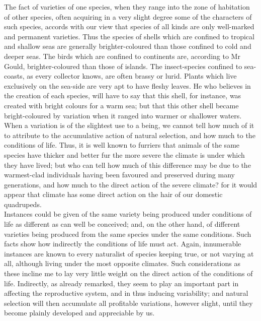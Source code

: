 \indent The fact of varieties of one species, when they range into the zone of habitation of other species, often acquiring in a very slight degree some of the characters of such species, accords with our view that species of all kinds are only well-marked and permanent varieties. Thus the species of shells which are confined to tropical and shallow seas are generally brighter-coloured than those confined to cold and deeper seas. The birds which are confined to continents are, according to Mr Gould, brighter-coloured than those of islands. The insect-species confined to sea-coasts, as every collector knows, are often brassy or lurid. Plants which live exclusively on the sea-side are very apt to have fleshy leaves. He who believes in the creation of each species, will have to say that this shell, for instance, was created with bright colours for a warm sea; but that this other shell became bright-coloured by variation when it ranged into warmer or shallower waters.\\
\indent When a variation is of the slightest use to a being, we cannot tell how much of it to attribute to the accumulative action of natural selection, and how much to the conditions of life. Thus, it is well known to furriers that animals of the same species have thicker and better fur the more severe the climate is under which they have lived; but who can tell how much of this difference may be due to the warmest-clad individuals having been favoured and preserved during many generations, and how much to the direct action of the severe climate? for it would appear that climate has some direct action on the hair of our domestic quadrupeds.\\
\indent Instances could be given of the same variety being produced under conditions of life as different as can well be conceived; and, on the other hand, of different varieties being produced from the same species under the same conditions. Such facts show how indirectly the conditions of life must act. Again, innumerable instances are known to every naturalist of species keeping true, or not varying at all, although living under the most opposite climates. Such considerations as these incline me to lay very little weight on the direct action of the conditions of life. Indirectly, as already remarked, they seem to play an important part in affecting the reproductive system, and in thus inducing variability; and natural selection will then accumulate all profitable variations, however slight, until they become plainly developed and appreciable by us.\\



